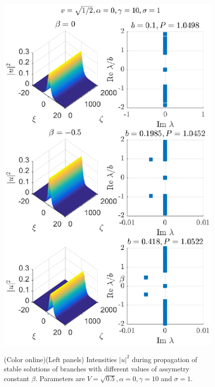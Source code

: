 \documentclass[aps,pre,showpacs,twocolumn]{revtex4}
\begin{document}
\begin{figure}[ht]
\begin{center}
\scalebox{.83} {\includegraphics{prop_beta_sigma1.eps}}
\end{center}
\caption{(Color online)(Left panels) Intensities $|u|^2$ during propagation of stable solutions of branches with different values of assymetry constant $\beta$. Parameters are $V=\sqrt{0.5},\alpha=0,\gamma=10$ and $\sigma=1$.}%
\label{fig:prop_beta_sigma1}%
\end{figure}
\end{document}
